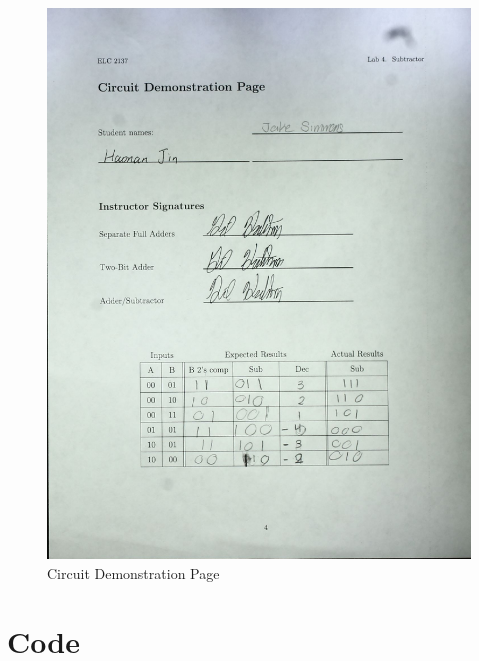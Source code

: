 \documentclass[11pt]{article}
\begin{document}
\begin{center}
	\begin{figure}
		\includegraphics[width=1\textwidth]{KIC_Document.pdf}
		\caption{Circuit Demonstration Page}
	\end{figure}
\end{center}

\clearpage
\section*{Code}
\end{document}
